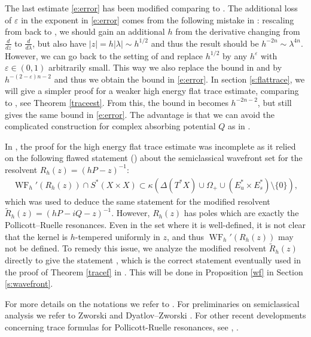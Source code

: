 \documentclass[reqno,12pt,letterpaper]{amsart}
\numberwithin{equation}{section}
\numberwithin{prop}{section}
\DeclareMathOperator{\WF}{WF}
\begin{document}
The last estimate \eqref{e:error} has been modified comparing to \cite[(1.5)]{local}. The additional loss of $\varepsilon$ in the exponent in \eqref{e:error} comes from the following mistake in \cite{local}: rescaling from \cite[(4.20)]{local} back to \cite[(4.1)]{local}, we should gain an additional $h$ from the derivative changing from $\frac{d}{dz}$ to $\frac{d}{d\lambda}$, but also have $|z|=h|\lambda|\sim h^{1/2}$ and thus the result should be $h^{-2n}\sim\lambda^{4n}$. However, we can go back to the setting of \cite[Proposition 3.4]{zeta} and replace $h^{1/2}$ by any $h^{\varepsilon}$ with $\varepsilon\in(0,1)$ arbitrarily small. This way we also replace the bound in \cite[(4.19)]{local} and \cite[(4.20)]{local} by $h^{-(2-\varepsilon)n-2}$ and thus we obtain the bound in \eqref{e:error}. In section \ref{s:flattrace}, we will give a simpler proof for a weaker high energy flat trace estimate, comparing to \cite[Proposition 3.1]{local}, see Theorem \ref{traceest}. From this, the bound in \cite[(4.20)]{local} becomes $h^{-2n-2}$, but still gives the same bound in \eqref{e:error}. The advantage is that we can avoid the complicated construction for complex absorbing potential $Q$ as in \cite[\S 2.5]{local}.

In \cite{local}, the proof for the high energy flat trace estimate \cite[Proposition 3.1]{local} was incomplete as it relied on the following flawed statement (\cite[(2.14)]{local}) about the semiclassical wavefront set for the resolvent $R_h(z)=(hP-z)^{-1}$:
\begin{align*}
    \WF_h'(R_h(z))\cap S^*(X\times X)\subset \kappa(\Delta(T^*X)\cup \Omega_+\cup(E_u^*\times E_s^*)\setminus\{0\}),
\end{align*}
which was used to deduce the same statement \cite[(2.19)]{local} for the modified resolvent $\widetilde{R}_h(z)=(hP-iQ-z)^{-1}$. However, $R_h(z)$ has poles which are exactly the Pollicott--Ruelle resonances. Even in the set where it is well-defined, it is not clear that the kernel is $h$-tempered uniformly in $z$, and thus $\WF_h'(R_h(z))$ may not be defined. To remedy this issue, we analyze the modified resolvent $\widetilde{R}_h(z)$ directly to give the statement \cite[(2.19)]{local}, which is the correct statement eventually used in the proof of Theorem \ref{tracef} in \cite{local}. This will be done in Proposition \ref{wf} in Section \ref{s:wavefront}.

For more details on the notations we refer to \cite{local}. For preliminaries on semiclassical analysis we refer to Zworski \cite{semibook} and Dyatlov--Zworski \cite[Appendix E]{resbook}. For other recent developments concerning trace formulas for Pollicott-Ruelle resonances, see \cite{Je1}, \cite{Je2}.
\end{document}
